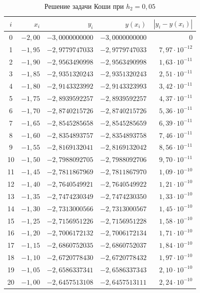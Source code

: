 \documentclass[14pt,a4paper]{extarticle}
\begin{document}
\begin{table}[H]
    \centering
    \caption{Решение задачи Коши при $h_2=0{,}05$}
    \label{tab:h2}
    \small
    \begin{tabular}{crrrr}
        \toprule
        $i$ & $x_i$ & $y_i$ & $y(x_i)$ & $|y_i-y(x_i)|$\\
        \midrule
        0  & $-2{,}00$ & $-3{,}0000000000$ & $-3{,}0000000000$ & 0\\
        1  & $-1{,}95$ & $-2{,}9779747033$ & $-2{,}9779747033$ & $7{,}97\cdot10^{-12}$\\
        2  & $-1{,}90$ & $-2{,}9563490998$ & $-2{,}9563490998$ & $1{,}63\cdot10^{-11}$\\
        3  & $-1{,}85$ & $-2{,}9351320243$ & $-2{,}9351320243$ & $2{,}51\cdot10^{-11}$\\
        4  & $-1{,}80$ & $-2{,}9143323992$ & $-2{,}9143323993$ & $3{,}42\cdot10^{-11}$\\
        5  & $-1{,}75$ & $-2{,}8939592257$ & $-2{,}8939592257$ & $4{,}37\cdot10^{-11}$\\
        6  & $-1{,}70$ & $-2{,}8740215726$ & $-2{,}8740215726$ & $5{,}36\cdot10^{-11}$\\
        7  & $-1{,}65$ & $-2{,}8545285658$ & $-2{,}8545285659$ & $6{,}39\cdot10^{-11}$\\
        8  & $-1{,}60$ & $-2{,}8354893757$ & $-2{,}8354893758$ & $7{,}46\cdot10^{-11}$\\
        9  & $-1{,}55$ & $-2{,}8169132041$ & $-2{,}8169132042$ & $8{,}56\cdot10^{-11}$\\
        10 & $-1{,}50$ & $-2{,}7988092705$ & $-2{,}7988092706$ & $9{,}70\cdot10^{-11}$\\
        11 & $-1{,}45$ & $-2{,}7811867969$ & $-2{,}7811867970$ & $1{,}09\cdot10^{-10}$\\
        12 & $-1{,}40$ & $-2{,}7640549921$ & $-2{,}7640549922$ & $1{,}21\cdot10^{-10}$\\
        13 & $-1{,}35$ & $-2{,}7474230349$ & $-2{,}7474230350$ & $1{,}33\cdot10^{-10}$\\
        14 & $-1{,}30$ & $-2{,}7313000566$ & $-2{,}7313000567$ & $1{,}45\cdot10^{-10}$\\
        15 & $-1{,}25$ & $-2{,}7156951226$ & $-2{,}7156951228$ & $1{,}58\cdot10^{-10}$\\
        16 & $-1{,}20$ & $-2{,}7006172132$ & $-2{,}7006172134$ & $1{,}71\cdot10^{-10}$\\
        17 & $-1{,}15$ & $-2{,}6860752035$ & $-2{,}6860752037$ & $1{,}84\cdot10^{-10}$\\
        18 & $-1{,}10$ & $-2{,}6720778430$ & $-2{,}6720778432$ & $1{,}97\cdot10^{-10}$\\
        19 & $-1{,}05$ & $-2{,}6586337341$ & $-2{,}6586337343$ & $2{,}10\cdot10^{-10}$\\
        20 & $-1{,}00$ & $-2{,}6457513108$ & $-2{,}6457513111$ & $2{,}24\cdot10^{-10}$\\
        \bottomrule
    \end{tabular}
\end{table}
\end{document}
